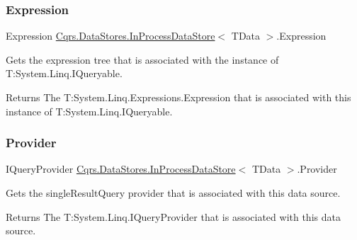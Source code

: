 \subsubsection{\texorpdfstring{Expression}{Expression}}
{\footnotesize\ttfamily Expression \hyperlink{classCqrs_1_1DataStores_1_1InProcessDataStore}{Cqrs.\+Data\+Stores.\+In\+Process\+Data\+Store}$<$ T\+Data $>$.Expression\hspace{0.3cm}{\ttfamily [get]}}



Gets the expression tree that is associated with the instance of T\+:\+System.\+Linq.\+I\+Queryable. 

\begin{DoxyReturn}{Returns}
The T\+:\+System.\+Linq.\+Expressions.\+Expression that is associated with this instance of T\+:\+System.\+Linq.\+I\+Queryable. 
\end{DoxyReturn}
\mbox{\label{classCqrs_1_1DataStores_1_1InProcessDataStore_a9f4e487d52f69245266afdf303d585c1_a9f4e487d52f69245266afdf303d585c1}} 
\subsubsection{\texorpdfstring{Provider}{Provider}}
{\footnotesize\ttfamily I\+Query\+Provider \hyperlink{classCqrs_1_1DataStores_1_1InProcessDataStore}{Cqrs.\+Data\+Stores.\+In\+Process\+Data\+Store}$<$ T\+Data $>$.Provider\hspace{0.3cm}{\ttfamily [get]}}



Gets the single\+Result\+Query provider that is associated with this data source. 

\begin{DoxyReturn}{Returns}
The T\+:\+System.\+Linq.\+I\+Query\+Provider that is associated with this data source. 
\end{DoxyReturn}
